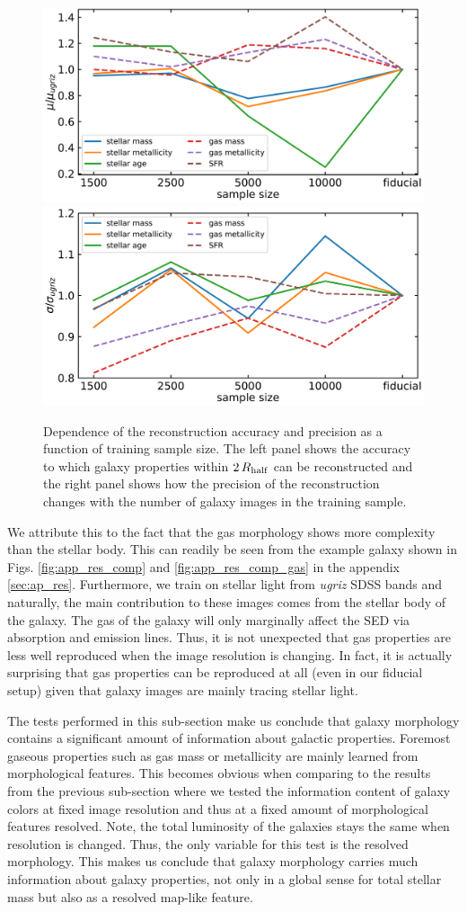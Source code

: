 \documentclass[useAMS,usenatbib]{mnras}
\begin{document}
\begin{figure}
\begin{center}
\includegraphics[width=.5\textwidth]{./plots/sample_comparison_mu.pdf}
\includegraphics[width=.4875\textwidth]{./plots/sample_comparison_sigma.pdf}
\end{center}
\vspace{-.35cm}
\caption{Dependence of the reconstruction accuracy and precision as a function of training sample size. The left panel shows the accuracy to which galaxy properties within $2\,R_{\rm half}$ can be reconstructed and the right panel shows how the precision of the reconstruction changes with the number of galaxy images in the training sample.}
\label{fig:sample_comp}
\end{figure}

We attribute this to the fact that the gas morphology shows more complexity than the stellar body.
This can readily be seen from the example galaxy shown in Figs. \ref{fig:app_res_comp} and \ref{fig:app_res_comp_gas} in the appendix \ref{sec:ap_res}. Furthermore, we train on stellar light from \emph{ugriz} SDSS bands and naturally, the main contribution to these images comes from the stellar body of the galaxy. The gas of the galaxy will only marginally affect the SED via absorption and emission lines. Thus, it is not unexpected that gas properties are less well reproduced when the image resolution is changing. In fact, it is actually surprising that gas properties can be reproduced at all (even in our fiducial setup) given that galaxy images are mainly tracing stellar light.

The tests performed in this sub-section make us conclude that galaxy morphology contains a significant amount of information about galactic properties. Foremost gaseous properties such as gas mass or metallicity are mainly learned from morphological features. This becomes obvious when comparing to the results from the previous sub-section where we tested the information content of galaxy colors at fixed image resolution and thus at a fixed amount of morphological features resolved. Note, the total luminosity of the galaxies stays the same when resolution is changed. Thus, the only variable for this test is the resolved morphology. This makes us conclude that galaxy morphology carries much information about galaxy properties, not only in a global sense for total stellar mass but also as a resolved map-like feature. 
\end{document}

